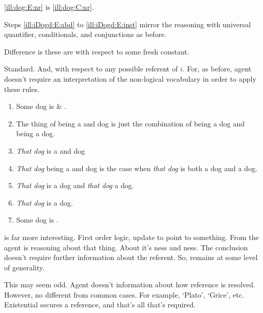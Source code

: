 \begin{note}
  \autoref{ill:dog:E:nr} is \ref{ill:dog:C:nr}.

  Steps \ref{ill:iDogd:E:abd} to \ref{ill:iDogd:E:inst} mirror the reasoning with universal quantifier, conditionals, and conjunctions as before.

  Difference is these are with respect to some fresh constant.

  Standard.
  And, \nr{} with respect to any possible referent of \(i\).
  For, as before, agent doesn't require an interpretation of the non-logical vocabulary in order to apply these rules.
\end{note}

\begin{note}[Exists \ur{}]
  \begin{illustration}\label{ill:dog:E:ur}
    \vspace{-\baselineskip}
    \begin{enumerate}[label=\(\protect\iEDog\)\space\arabic*., ref=(\(\protect\iEDog\)\space\arabic*), align=left, leftmargin=*]
    \item Some dog is \RIPa{} \& \RIPb{}.
    \item The thing of being a \RIPa{} and \RIPb{} dog is just the combination of being a \RIPa{} dog and being a \RIPb{} dog.
    \item \emph{That dog} is a \RIPa{} and \RIPb{} dog
    \item \emph{That dog} being a \RIPa{} and \RIPb{} dog is the case when \emph{that dog} is both a \RIPa{} dog and a \RIPb{} dog.
    \item \emph{That dog} is a \RIPa{} dog and \emph{that dog} a \RIPb{} dog.
    \item \emph{That dog} is a \RIPb{} dog.
    \item Some dog is \RIPb{}.
    \end{enumerate}
    \vspace{-\baselineskip}
  \end{illustration}
\end{note}

\begin{note}
  \ur{} is far more interesting.
  First order logic, update to point to something.
  From \ur{} the agent is reasoning about that thing.
  About it's \RIPa{}ness and \RIPb{}ness.
  The conclusion doesn't require further information about the referent.
  So, remains at some level of generality.

  This may seem odd.
  Agent doesn't information about how reference is resolved.
  However, no different from common cases.
  For example, `Plato', `Grice', etc.
  Existential secures a reference, and that's all that's required.
\end{note}

